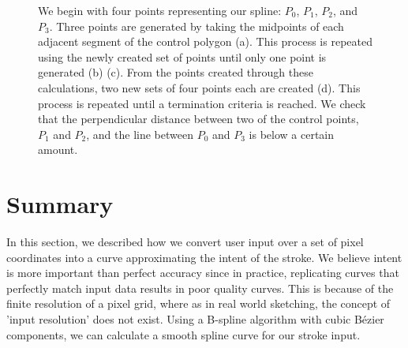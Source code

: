 \begin{figure}
\begin{center}
\end{center}
\caption[Creating the subdivided polyline from the control points]{We begin with four points representing our spline: $P_0$, $P_1$, $P_2$, and $P_3$. Three points are generated by taking the midpoints of each adjacent segment of the control polygon (a). This process is repeated using the newly created set of points until only one point is generated (b) (c). From the points created through these calculations, two new sets of four points each are created (d). This process is repeated until a termination criteria is reached. We check that the perpendicular distance between two of the control points, $P_1$ and $P_2$, and the line between $P_0$ and $P_3$ is below a certain amount.}
\label{fig:subdiv}
\end{figure}

\section{Summary}
In this section, we described how we convert user input over a set of pixel coordinates into a curve approximating the intent of the stroke.
We believe intent is more important than perfect accuracy since in practice, replicating curves that perfectly match input data results in poor quality curves.
This is because of the finite resolution of a pixel grid, where as in real world sketching, the concept of 'input resolution' does not exist.
Using a B-spline algorithm with cubic B\'{e}zier components, we can calculate a smooth spline curve for our stroke input.